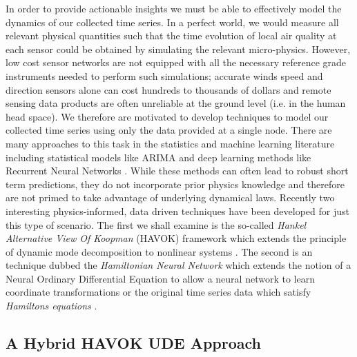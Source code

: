 In order to provide actionable insights we must be able to effectively model the dynamics of our collected time series. In a perfect world, we would measure all relevant physical quantities such that the time evolution of local air quality at each sensor could be obtained by simulating the relevant micro-physics. However, low cost sensor networks are not equipped with all the necessary reference grade instruments needed to perform such simulations; accurate winds speed and direction sensors alone can cost hundreds to thousands of dollars and remote sensing data products are often unreliable at the ground level (i.e. in the human head space). We therefore are motivated to develop techniques to model our collected time series using only the data provided at a single node. There are many approaches to this task in the statistics and machine learning literature including statistical models like ARIMA and deep learning methods like Recurrent Neural Networks \cite{intro-to-time-series-models, time-series-rnns}. While these methods can often lead to robust short term predictions, they do not incorporate prior physics knowledge and therefore are not primed to take advantage of underlying dynamical laws. Recently two interesting physics-informed, data driven techniques have been developed for just this type of scenario. The first we shall examine is the so-called \textit{Hankel Alternative View Of Koopman} (HAVOK) framework which extends the principle of dynamic mode decomposition to nonlinear systems \cite{brunton-havok}. The second is an technique dubbed the \textit{Hamiltonian Neural Network} which extends the notion of a Neural Ordinary Differential Equation to allow a neural network to learn coordinate transformations or the original time series data which satisfy \textit{Hamiltons equations} \cite{greydanus-hnn}.

\subsection{A Hybrid HAVOK UDE Approach}


